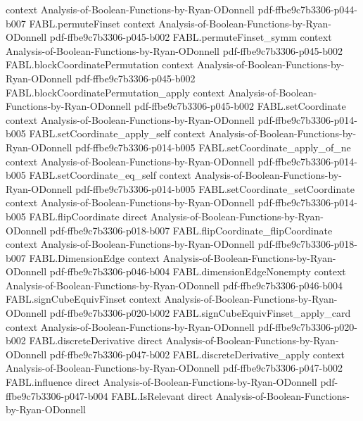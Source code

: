\begin{theorem}
  {context}
  {Analysis-of-Boolean-Functions-by-Ryan-ODonnell}
  {pdf-ffbe9c7b3306-p044-b007}
\proofstep
  {FABL.permuteFinset}
  {context}
  {Analysis-of-Boolean-Functions-by-Ryan-ODonnell}
  {pdf-ffbe9c7b3306-p045-b002}
\proofstep
  {FABL.permuteFinset_symm}
  {context}
  {Analysis-of-Boolean-Functions-by-Ryan-ODonnell}
  {pdf-ffbe9c7b3306-p045-b002}
\proofstep
  {FABL.blockCoordinatePermutation}
  {context}
  {Analysis-of-Boolean-Functions-by-Ryan-ODonnell}
  {pdf-ffbe9c7b3306-p045-b002}
\proofstep
  {FABL.blockCoordinatePermutation_apply}
  {context}
  {Analysis-of-Boolean-Functions-by-Ryan-ODonnell}
  {pdf-ffbe9c7b3306-p045-b002}
\proofstep
  {FABL.setCoordinate}
  {context}
  {Analysis-of-Boolean-Functions-by-Ryan-ODonnell}
  {pdf-ffbe9c7b3306-p014-b005}
\proofstep
  {FABL.setCoordinate_apply_self}
  {context}
  {Analysis-of-Boolean-Functions-by-Ryan-ODonnell}
  {pdf-ffbe9c7b3306-p014-b005}
\proofstep
  {FABL.setCoordinate_apply_of_ne}
  {context}
  {Analysis-of-Boolean-Functions-by-Ryan-ODonnell}
  {pdf-ffbe9c7b3306-p014-b005}
\proofstep
  {FABL.setCoordinate_eq_self}
  {context}
  {Analysis-of-Boolean-Functions-by-Ryan-ODonnell}
  {pdf-ffbe9c7b3306-p014-b005}
\proofstep
  {FABL.setCoordinate_setCoordinate}
  {context}
  {Analysis-of-Boolean-Functions-by-Ryan-ODonnell}
  {pdf-ffbe9c7b3306-p014-b005}
\proofstep
  {FABL.flipCoordinate}
  {direct}
  {Analysis-of-Boolean-Functions-by-Ryan-ODonnell}
  {pdf-ffbe9c7b3306-p018-b007}
\proofstep
  {FABL.flipCoordinate_flipCoordinate}
  {context}
  {Analysis-of-Boolean-Functions-by-Ryan-ODonnell}
  {pdf-ffbe9c7b3306-p018-b007}
\proofstep
  {FABL.DimensionEdge}
  {context}
  {Analysis-of-Boolean-Functions-by-Ryan-ODonnell}
  {pdf-ffbe9c7b3306-p046-b004}
\proofstep
  {FABL.dimensionEdgeNonempty}
  {context}
  {Analysis-of-Boolean-Functions-by-Ryan-ODonnell}
  {pdf-ffbe9c7b3306-p046-b004}
\proofstep
  {FABL.signCubeEquivFinset}
  {context}
  {Analysis-of-Boolean-Functions-by-Ryan-ODonnell}
  {pdf-ffbe9c7b3306-p020-b002}
\proofstep
  {FABL.signCubeEquivFinset_apply_card}
  {context}
  {Analysis-of-Boolean-Functions-by-Ryan-ODonnell}
  {pdf-ffbe9c7b3306-p020-b002}
\proofstep
  {FABL.discreteDerivative}
  {direct}
  {Analysis-of-Boolean-Functions-by-Ryan-ODonnell}
  {pdf-ffbe9c7b3306-p047-b002}
\proofstep
  {FABL.discreteDerivative_apply}
  {context}
  {Analysis-of-Boolean-Functions-by-Ryan-ODonnell}
  {pdf-ffbe9c7b3306-p047-b002}
\proofstep
  {FABL.influence}
  {direct}
  {Analysis-of-Boolean-Functions-by-Ryan-ODonnell}
  {pdf-ffbe9c7b3306-p047-b004}
\proofstep
  {FABL.IsRelevant}
  {direct}
  {Analysis-of-Boolean-Functions-by-Ryan-ODonnell}

\end{theorem}
